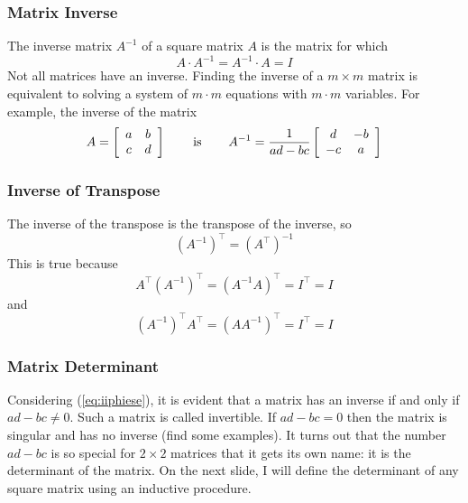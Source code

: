 \documentclass[xcolor=dvipsnames]{beamer}
\begin{document}
\begin{frame}
  \frametitle{Matrix Inverse}
The \alert{inverse matrix} $A^{-1}$ of a square matrix $A$ is the
matrix for which
\begin{equation}
  \label{eq:quoovain}
  A\cdot{}A^{-1}=A^{-1}\cdot{}A=I
\end{equation}
Not all matrices have an inverse. Finding the inverse of a
$m\times{}m$ matrix is equivalent to solving a system of $m\cdot{}m$
equations with $m\cdot{}m$ variables. For example, the inverse of the
matrix
\begin{equation}
  \label{eq:iiphiese}
  A=\left[
    \begin{array}{cc}
      a & b \\
      c & d
    \end{array}\right]\hspace{.25in}\mbox{ is }\hspace{.25in}A^{-1}=\frac{1}{ad-bc}\left[
    \begin{array}{cc}
      d & -b \\
      -c & a
    \end{array}\right]
\end{equation}
\end{frame}

\begin{frame}
  \frametitle{Inverse of Transpose}
  The inverse of the transpose is the transpose of the inverse, so
  \begin{equation}
    \label{eq:ieroonge}
    \left(A^{-1}\right)^{\intercal}=\left(A^{\intercal}\right)^{-1}
  \end{equation}
  This is true because
  \begin{equation}
    \label{eq:gahmagee}
    A^{\intercal}\left(A^{-1}\right)^{\intercal}=\left(A^{-1}A\right)^{\intercal}=I^{\intercal}=I
  \end{equation}
  and
  \begin{equation}
    \label{eq:raengied}
    \left(A^{-1}\right)^{\intercal}A^{\intercal}=\left(AA^{-1}\right)^{\intercal}=I^{\intercal}=I
  \end{equation}
\end{frame}

\begin{frame}
  \frametitle{Matrix Determinant}
  Considering (\ref{eq:iiphiese}), it is evident that a matrix has an
  inverse if and only if $ad-bc\neq{}0$. Such a matrix is called
  \alert{invertible}. If $ad-bc=0$ then the matrix is \alert{singular}
  and has no inverse (find some examples). It turns out that the
  number $ad-bc$ is so special for $2\times{}2$ matrices that it gets
  its own name: it is the \alert{determinant} of the matrix. On the
  next slide, I will define the determinant of any square matrix using
  an inductive procedure.
\end{frame}
\end{document}
